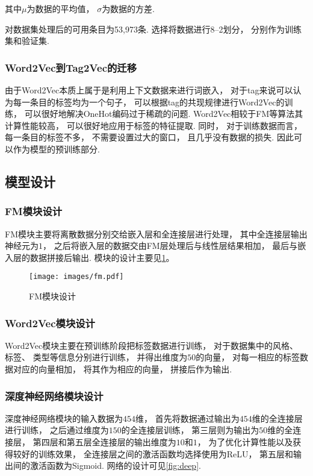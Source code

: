 其中$\mu$为数据的平均值，
$\sigma$为数据的方差.

对数据集处理后的可用条目为53,973条.
选择将数据进行8--2划分，
分别作为训练集和验证集.

\subsubsection{Word2Vec到Tag2Vec的迁移}

由于Word2Vec本质上属于是利用上下文数据来进行词嵌入，
对于tag来说可以认为每一条目的标签均为一个句子，
可以根据tag的共现规律进行Word2Vec的训练，
可以很好地解决OneHot编码过于稀疏的问题.
Word2Vec相较于FM等算法其计算性能较高，
可以很好地应用于标签的特征提取.
同时，
对于训练数据而言，
每一条目的标签不多，
不需要设置过大的窗口，
且几乎没有数据的损失.
因此可以作为模型的预训练部分.

\subsection{模型设计\label{sec:design}}

\subsubsection{FM模块设计}

FM模块主要将离散数据分别交给嵌入层和全连接层进行处理，
其中全连接层输出神经元为$1$，
之后将嵌入层的数据交由FM层处理后与线性层结果相加，
最后与嵌入层的数据拼接后输出.
模块的设计主要见\cref{fig:fm}。

\begin{figure}[!htbp]
  \centering
  \texttt{[image: images/fm.pdf]}
  \caption{FM模块设计}\label{fig:fm}
\end{figure}

\subsubsection{Word2Vec模块设计}

Word2Vec模块主要在预训练阶段把标签数据进行训练，
对于数据集中的风格、
标签、
类型等信息分别进行训练，
并得出维度为$50$的向量，
对每一相应的标签数据对应的向量相加，
将其作为相应的向量，
拼接后作为输出.

\subsubsection{深度神经网络模块设计}

深度神经网络模块的输入数据为$454$维，
首先将数据通过输出为$454$维的全连接层进行训练，
之后通过维度为$150$的全连接层训练，
第三层则为输出为$50$维的全连接层，
第四层和第五层全连接层的输出维度为$10$和$1$，
为了优化计算性能以及获得较好的训练效果，
全连接层之间的激活函数均选择使用为ReLU，
第五层和输出间的激活函数为Sigmoid.
网络的设计可见\cref{fig:deep}.

